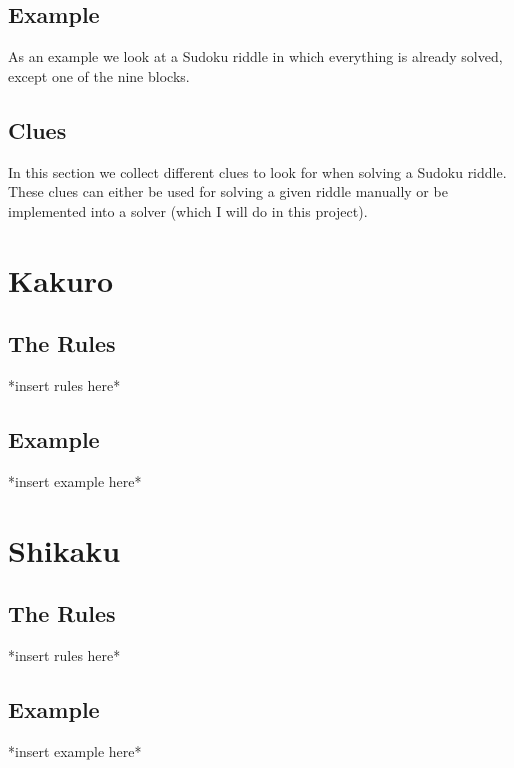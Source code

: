 \documentclass[12pt]{article}
\begin{document}
	\subsection*{Example}
	
	As an example we look at a Sudoku riddle in which everything is already solved, except one of the nine blocks.
	
	\subsection*{Clues}
	
	In this section we collect different clues to look for when solving a Sudoku riddle. These clues can either be used for solving a given riddle manually or be implemented into a solver (which I will do in this project).
	
	\newpage
	
	\section*{Kakuro}
	
	\subsection*{The Rules}
	
	*insert rules here*
	
	\subsection*{Example}
	
	*insert example here*
	
	\newpage
	
	\section*{Shikaku}
	
	\subsection*{The Rules}
	
	*insert rules here*
	
	\subsection*{Example}
	
	*insert example here*
	
\end{document}
